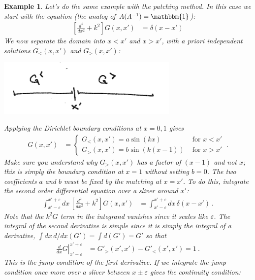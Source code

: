 \documentclass[
  11pt,
	colorful,
	raggedright,
]{tufte-style-thesis-flip}
\newtheorem{example}{Example}[section]
\begin{document}
\begin{example}\label{ex:patching:eg}
Let's do the same example with the patching method. In this case we start with the equation (the analog of $A(A^{-1}) =\mathbbm{1}$):
\begin{align}
  \left[\frac{d^2}{dx^2} + k^2\right]G(x,x') &= \delta(x-x')
\end{align}
We now separate the domain into $x<x'$ and $x>x'$, with \emph{a priori} independent solutions $G_<(x,x')$ and $G_>(x,x')$:
\begin{center}
\includegraphics[width=.5\textwidth]{figures/lec11_GgGl.png}
\end{center}
Applying the Dirichlet boundary conditions at $x=0,1$ gives
\begin{align}
  G(x,x') &=
  \begin{cases}
  G_<(x,x') = a\sin(kx) & \text{ for } x < x'\\
  G_>(x,x') = b\sin\left(k(x-1)\right) & \text{ for } x > x'
  \end{cases} \ .
\end{align}
Make sure you understand why $G_>(x,x')$ has a factor of $(x-1)$ and not $x$; this is simply the boundary condition at $x=1$ without setting $b=0$.
The two coefficients $a$ and $b$ must be fixed by the matching at $x=x'$. 
To do this, integrate the second order differential equation over a sliver around $x'$:
\begin{align}
  \int_{x'-\varepsilon}^{x'+\varepsilon}
  dx \, 
  \left[
   \frac{d^2}{dx^2} + k^2
  \right]
  G(x,x')
  &=
  \int_{x'-\varepsilon}^{x'+\varepsilon} dx\, \delta (x-x') \ .
  \label{eq:eg:jump:condition:integration:eg:1}
\end{align}
Note that the $k^2 G$ term in the integrand vanishes since it scales like $\varepsilon$. The integral of the second derivative is simple since it is simply the integral of a derivative, $\int dx\, d/dx(G') = \int d(G') = G'$ so that
\begin{align}
  \left.\frac{d}{dx}G\right|_{x'-\varepsilon}^{x'+\varepsilon}
  &=
  G'_>(x',x') - G'_<(x',x')
  =
   1 \ .
   \label{eq:eg:patching:jump:condition}
\end{align}
This is the jump condition of the first derivative. If we integrate the jump condition once more over a sliver between $x\pm\varepsilon$ gives the continuity condition:

\end{example}
\end{document}
